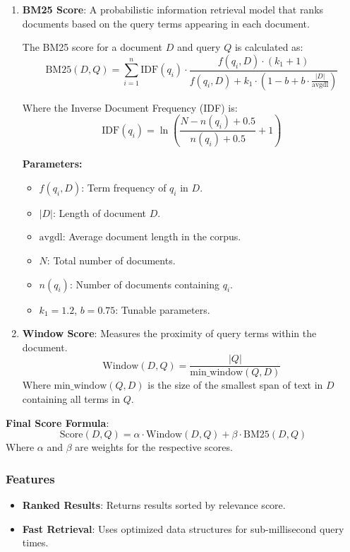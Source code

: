 \documentclass[11pt, a4paper]{article}
\begin{document}
\begin{enumerate}
    \item \textbf{BM25 Score}: A probabilistic information retrieval model that ranks documents based on the query terms appearing in each document.
    
    The BM25 score for a document $D$ and query $Q$ is calculated as:
    \[ \text{BM25}(D, Q) = \sum_{i=1}^{n} \text{IDF}(q_i) \cdot \frac{f(q_i, D) \cdot (k_1 + 1)}{f(q_i, D) + k_1 \cdot (1 - b + b \cdot \frac{|D|}{\text{avgdl}})} \]
    
    Where the Inverse Document Frequency (IDF) is:
    \[ \text{IDF}(q_i) = \ln \left( \frac{N - n(q_i) + 0.5}{n(q_i) + 0.5} + 1 \right) \]
    
    \textbf{Parameters:}
    \begin{itemize}
        \item $f(q_i, D)$: Term frequency of $q_i$ in $D$.
        \item $|D|$: Length of document $D$.
        \item $\text{avgdl}$: Average document length in the corpus.
        \item $N$: Total number of documents.
        \item $n(q_i)$: Number of documents containing $q_i$.
        \item $k_1 = 1.2$, $b = 0.75$: Tunable parameters.
    \end{itemize}

    \item \textbf{Window Score}: Measures the proximity of query terms within the document.
    \[ \text{Window}(D, Q) = \frac{|Q|}{\text{min\_window}(Q, D)} \]
    Where $\text{min\_window}(Q, D)$ is the size of the smallest span of text in $D$ containing all terms in $Q$.
\end{enumerate}

\textbf{Final Score Formula}:
\[ \text{Score}(D, Q) = \alpha \cdot \text{Window}(D, Q) + \beta \cdot \text{BM25}(D, Q) \]
Where $\alpha$ and $\beta$ are weights for the respective scores.

\subsubsection*{Features}
\begin{itemize}
    \item \textbf{Ranked Results}: Returns results sorted by relevance score.
    \item \textbf{Fast Retrieval}: Uses optimized data structures for sub-millisecond query times.
\end{itemize}
\end{document}
